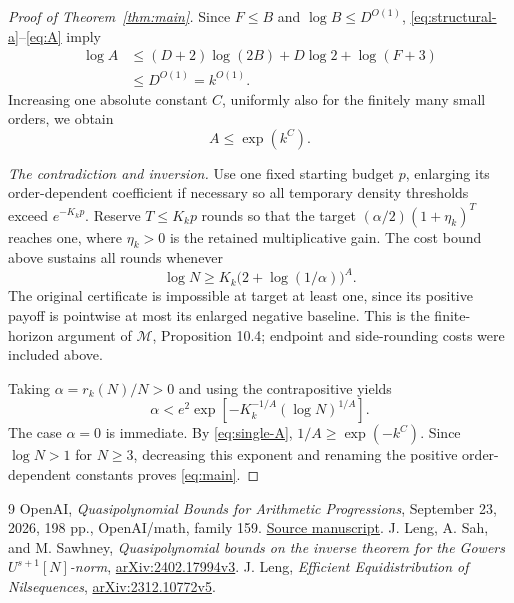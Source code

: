 \documentclass[11pt,a4paper]{article}
\theoremstyle{definition}
\newcommand{\M}{\mathcal M}
\begin{document}
\begin{proof}[Proof of Theorem~\ref{thm:main}]
Since \(F\le B\) and \(\log B\le D^{O(1)}\),
\eqref{eq:structural-a}--\eqref{eq:A} imply
\begin{align*}
 \log A
 &\le(D+2)\log(2B)+D\log2+\log(F+3)\\
 &\le D^{O(1)}=k^{O(1)}.
\end{align*}
Increasing one absolute constant \(C\), uniformly also for the finitely
many small orders, we obtain
\begin{equation}\label{eq:single-A}
 A\le\exp(k^C).
\end{equation}

\textit{The contradiction and inversion.}
Use one fixed starting budget \(p\), enlarging its order-dependent
coefficient if necessary so all temporary density thresholds exceed
\(e^{-K_kp}\). Reserve \(T\le K_kp\) rounds so that the target
\((\alpha/2)(1+\eta_k)^T\) reaches one, where \(\eta_k>0\) is
the retained multiplicative gain. The cost bound above sustains all
rounds whenever
\[
 \log N\ge K_k\bigl(2+\log(1/\alpha)\bigr)^A.
\]
The original certificate is impossible at target at least one, since
its positive payoff is pointwise at most its enlarged negative
baseline. This is the finite-horizon argument of \(\M\),
Proposition 10.4; endpoint and side-rounding costs were included above.

Taking \(\alpha=r_k(N)/N>0\) and using the contrapositive yields
\[
 \alpha< e^2\exp\!\left[-K_k^{-1/A}(\log N)^{1/A}\right].
\]
The case \(\alpha=0\) is immediate. By \eqref{eq:single-A},
\(1/A\ge\exp(-k^C)\). Since \(\log N>1\) for \(N\ge3\),
decreasing this exponent and renaming the positive order-dependent
constants proves \eqref{eq:main}.
\end{proof}

\begin{thebibliography}{9}
\small
{}
OpenAI, \emph{Quasipolynomial Bounds for Arithmetic Progressions},
September 23, 2026, 198 pp., OpenAI/math, family 159.
\href{https://github.com/openai/math/blob/main/preprints/Quasipolynomial-Bounds-for-Arithmetic-Progressions-September-23-2026/paper.pdf}{Source manuscript}.
J. Leng, A. Sah, and M. Sawhney,
\emph{Quasipolynomial bounds on the inverse theorem for the Gowers
\(U^{s+1}[N]\)-norm},
\href{https://arxiv.org/abs/2402.17994v3}{arXiv:2402.17994v3}.
J. Leng, \emph{Efficient Equidistribution of Nilsequences},
\href{https://arxiv.org/abs/2312.10772v5}{arXiv:2312.10772v5}.
\end{thebibliography}
\end{document}

